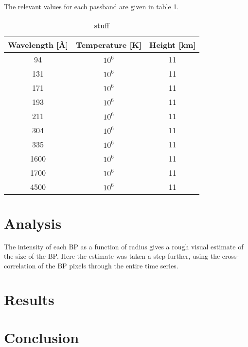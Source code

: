 \documentclass[preprint2]{aastex}
\begin{document}
The relevant values for each passband are given in table \ref{aia}.
\begin{table}[h]
\centering
    \begin{tabular}{c c c}
        \hline\hline
        Wavelength [\AA{}] & Temperature [K] & Height [km]\\ 
        \hline
        94 & $10^{6}$ & 11\\
        131 & $10^{6}$ & 11\\
        171 & $10^{6}$ & 11\\
        193 & $10^{6}$ & 11\\
        211 & $10^{6}$ & 11\\
        304 & $10^{6}$ & 11\\
        335 & $10^{6}$ & 11\\
        1600 & $10^{6}$ & 11\\
        1700 & $10^{6}$ & 11\\
        4500 & $10^{6}$ & 11\\
    \end{tabular}
\caption{stuff}
\label{aia}
\end{table}

\section{Analysis}\label{analysis}
The intensity of each BP as a function of radius gives a rough visual estimate
of the size of the BP. Here the estimate was taken a step further, using the
cross-correlation of the BP pixels through the entire time series.

\section{Results}\label{results}
\section{Conclusion}\label{conclusion}


\end{document}
